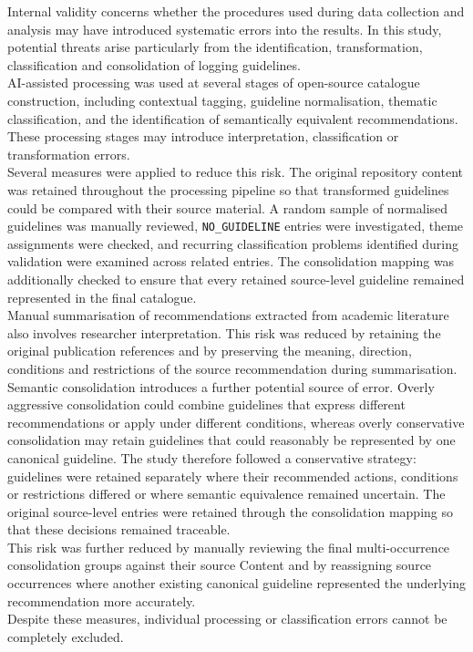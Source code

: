 Internal validity concerns whether the procedures used during data collection and
analysis may have introduced systematic errors into the results. In this study,
potential threats arise particularly from the identification, transformation,
classification and consolidation of logging guidelines.
\\
AI-assisted processing was used at several stages of open-source catalogue
construction, including contextual tagging, guideline normalisation, thematic
classification, and the identification of semantically equivalent recommendations.
These processing stages may introduce interpretation, classification or
transformation errors.
\\
Several measures were applied to reduce this risk. The original repository content
was retained throughout the processing pipeline so that transformed guidelines could
be compared with their source material. A random sample of normalised guidelines was
manually reviewed, \texttt{NO\_GUIDELINE} entries were investigated, theme assignments
were checked, and recurring classification problems identified during validation were
examined across related entries. The consolidation mapping was additionally checked
to ensure that every retained source-level guideline remained represented in the
final catalogue.
\\
Manual summarisation of recommendations extracted from academic literature also
involves researcher interpretation. This risk was reduced by retaining the original
publication references and by preserving the meaning, direction, conditions and
restrictions of the source recommendation during summarisation.
\\
Semantic consolidation introduces a further potential source of error. Overly
aggressive consolidation could combine guidelines that express different
recommendations or apply under different conditions, whereas overly conservative
consolidation may retain guidelines that could reasonably be represented by one
canonical guideline. The study therefore followed a conservative strategy:
guidelines were retained separately where their recommended actions, conditions or
restrictions differed or where semantic equivalence remained uncertain. The original
source-level entries were retained through the consolidation mapping so that these
decisions remained traceable.
\\
This risk was further reduced by manually reviewing the final multi-occurrence consolidation groups against their source Content 
and by reassigning source occurrences where another existing canonical guideline represented the underlying recommendation more accurately.
\\
Despite these measures, individual processing or classification errors cannot be
completely excluded.

